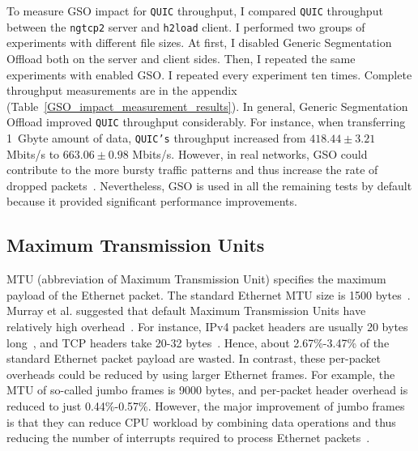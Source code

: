 \documentclass[12pt,a4paper]{report}
\begin{document}
    To measure GSO impact for \texttt{QUIC} throughput, I compared \texttt{QUIC} throughput between the \texttt{ngtcp2} server and \texttt{h2load} client.
    I performed two groups of experiments with different file sizes.
    At first, I disabled Generic Segmentation Offload both on the server and client sides.
    Then, I repeated the same experiments with enabled GSO.
    I repeated every experiment ten times.
    Complete throughput measurements are in the appendix (Table~\ref{GSO_impact_measurement_results}).
    In general, Generic Segmentation Offload improved \texttt{QUIC} throughput considerably.
    For instance, when transferring 1~Gbyte amount of data, \texttt{QUIC's} throughput increased from $418.44 \pm 3.21$ Mbits/s to $663.06 \pm 0.98$ Mbits/s.
    However, in real networks, GSO could contribute to the more bursty traffic patterns and thus increase the rate of dropped packets~\cite{accelerating-udp-packet-transmission-for-quic}.
    Nevertheless, GSO is used in all the remaining tests by default because it provided significant performance improvements.


\subsection{Maximum Transmission Units}
  MTU (abbreviation of Maximum Transmission Unit) specifies the maximum payload of the Ethernet packet.
  The standard Ethernet MTU size is 1500 bytes~\cite{The_Ethernet_Frame_Payload_Size_and_Its_Effect_on_IPv4_and_IPv6_Traffic}. 
  Murray et al. suggested that default Maximum Transmission Units have relatively high overhead~\cite{Large_MTUs_and_Internet_Performance}.
  For instance, IPv4 packet headers are usually 20 bytes long~\cite{FallKevinR2012TiV1}, and TCP headers take 20-32 bytes~\cite{Large_MTUs_and_Internet_Performance}.
  Hence, about 2.67\%-3.47\% of the standard Ethernet packet payload are wasted.
  In contrast, these per-packet overheads could be reduced by using larger Ethernet frames.
  For example, the MTU of so-called jumbo frames is 9000 bytes, and per-packet header overhead is reduced to just 0.44\%-0.57\%.
  However, the major improvement of jumbo frames is that they can reduce CPU workload by combining data operations and thus reducing the number of interrupts required to process Ethernet packets~\cite{Extended_rame_Sizes_for_Next_Generation_Ethernets}.
  
  
  
\end{document}
